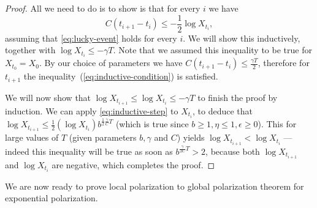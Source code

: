 \documentclass[11pt]{article}
\begin{document}
\begin{proof}
	All we need to do is to show is that for every $i$ we have 
	\begin{equation}
		C(t_{i+1} - t_i) \leq -\frac{1}{2} \log X_{t_i},
		\label{eq:inductive-condition}
	\end{equation}
	assuming that \cref{eq:lucky-event} holds for every $i$.
	We will show this inductively, together with $\log X_{t_i} \leq - \gamma T$. Note that we assumed this inequality to be true for $X_{t_0} = X_0$. By our choice of parameters we have $C(t_{i+1} - t_i) \leq \frac{\gamma T}{2}$, therefore for $t_{i+1}$ the inequality~(\ref{eq:inductive-condition}) is satisfied. 
	
	We will now show that $\log X_{t_{i+1}} \leq \log X_{t_i} \leq - \gamma T$ to finish the proof by induction. We can apply \cref{eq:inductive-step} to $X_{t_i}$, to deduce that $\log X_{t_{i+1}} \leq \frac{1}{2} (\log X_{t_i}) b^{\frac{1}{2} \frac{\gamma}{C} T}$ (which is true since $b\ge 1, \eta\le 1, \epsilon\ge 0$). This for large values of $T$ (given parameters $b, \gamma$ and $C$) yields $\log X_{t_{i+1}} < \log X_{t_i}$ --- indeed this inequality will be true as soon as $b^{\frac{\gamma}{2C} T} > 2$, because both $\log X_{t_{i+1}}$ and $\log X_{t_i}$ are negative, which completes the proof.
\end{proof}

We are now ready to prove local polarization to global polarization theorem for exponential polarization.
\end{document}
